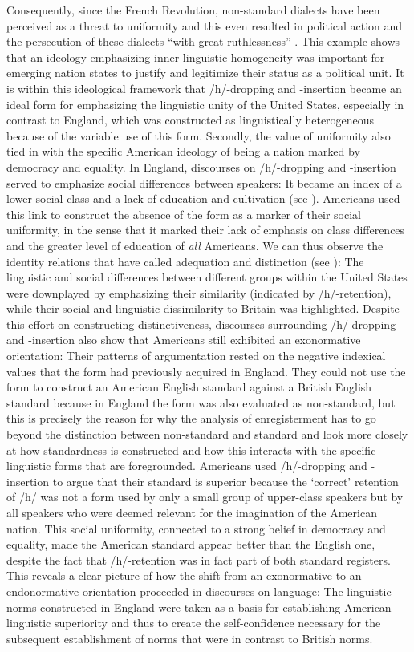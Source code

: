 Consequently, since the French Revolution, non-standard dialects have been perceived as a threat to uniformity and this even resulted in political action and the persecution of these dialects “with great ruthlessness” \citep[6]{Lodge2013}. This example shows that an ideology emphasizing inner linguistic homogeneity was important for emerging nation states to justify and legitimize their status as a political unit. It is within this ideological framework that /h/-dropping and -insertion became an ideal form for emphasizing the linguistic unity of the United States, especially in contrast to England, which was constructed as linguistically heterogeneous because of the variable use of this form. Secondly, the value of uniformity also tied in with the specific American ideology of being a nation marked by democracy and equality. In England, discourses on /h/-dropping and -insertion served to emphasize social differences between speakers: It became an index of a lower social class and a lack of education and cultivation (see ). Americans used this link to construct the absence of the form as a marker of their social uniformity, in the sense that it marked their lack of emphasis on class differences and the greater level of education of \emph{all} Americans. We can thus observe the identity relations that \citet{Bucholtz2005} have called adequation and distinction (see ): The linguistic and social differences between different groups within the United States were downplayed by emphasizing their similarity (indicated by /h/-retention), while their social and linguistic dissimilarity to Britain was highlighted. Despite this effort on constructing distinctiveness, discourses surrounding /h/-dropping and -insertion also show that Americans still exhibited an exonormative orientation: Their patterns of argumentation rested on the negative indexical values that the form had previously acquired in England. They could not use the form to construct an American English standard against a British English standard because in England the form was also evaluated as non-standard, but this is precisely the reason for why the analysis of enregisterment has to go beyond the distinction between non-standard and standard and look more closely at how standardness is constructed and how this interacts with the specific linguistic forms that are foregrounded. Americans used /h/-dropping and \--insertion to argue that their standard is superior because the ‘correct’ retention of /h/ was not a form used by only a small group of upper-class speakers but by all speakers who were deemed relevant for the imagination of the American nation. This social uniformity, connected to a strong belief in democracy and equality, made the American standard appear better than the English one, despite the fact that /h/-retention was in fact part of both standard registers. This reveals a clear picture of how the shift from an exonormative to an endonormative orientation proceeded in discourses on language: The linguistic norms constructed in England were taken as a basis for establishing American linguistic superiority and thus to create the self-confidence necessary for the subsequent establishment of norms that were in contrast to British norms.


